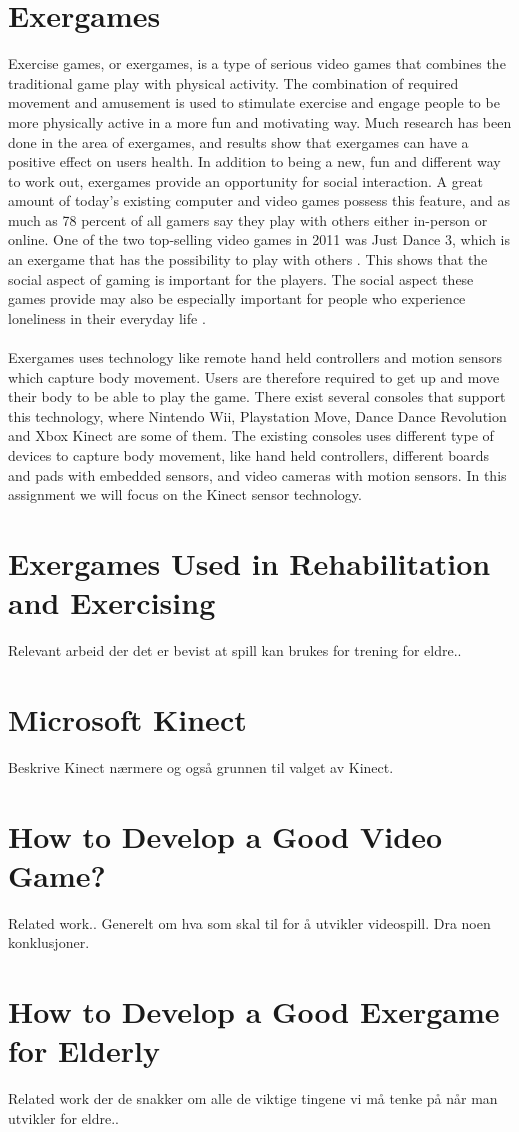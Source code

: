 \section{Exergames}
Exercise games, or exergames, is a type of serious video games that combines the traditional game play with physical activity. The combination of required movement and amusement is used to stimulate exercise and engage people to be more physically active in a more fun and motivating way. Much research has been done in the area of exergames, and results show that exergames can have a positive effect on users health. In addition to being a new, fun and different way to work out, exergames provide an opportunity for social interaction. A great amount of today’s existing computer and video games possess this feature, and as much as 78 percent of all gamers say they play with others either in-person or online. One of the two top-selling video games in 2011 was Just Dance 3, which is an exergame that has the possibility to play with others \cite{statistics2012}. This shows that the social aspect of gaming is important for the players. The social aspect these games provide may also be especially important for people who experience loneliness in their everyday life \cite{project}.\\ \\
Exergames uses technology like remote hand held controllers and motion sensors which capture body movement. Users are therefore required to get up and move their body to be able to play the game. There exist several consoles that support this technology, where Nintendo Wii, Playstation Move, Dance Dance Revolution and Xbox Kinect are some of them. The existing consoles uses different type of devices to capture body movement, like hand held controllers, different boards and pads with embedded sensors, and video cameras with motion sensors. In this assignment we will focus on the Kinect sensor technology. 
\section{Exergames Used in Rehabilitation and Exercising}
Relevant arbeid der det er bevist at spill kan brukes for trening for eldre.. 
\section{Microsoft Kinect}
Beskrive Kinect nærmere og også grunnen til valget av Kinect. 
\section{How to Develop a Good Video Game?}
Related work.. Generelt om hva som skal til for å utvikler videospill. Dra noen konklusjoner.
\section{How to Develop a Good Exergame for Elderly}
Related work der de snakker om alle de viktige tingene vi må tenke på når man utvikler for eldre..

